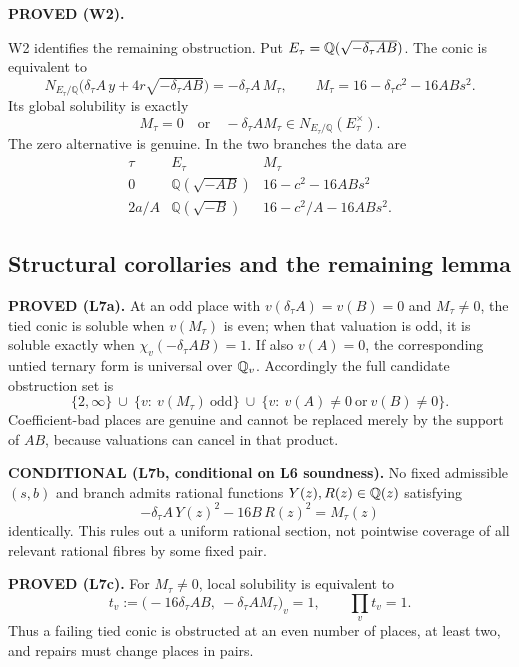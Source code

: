 \textbf{PROVED (W2).}

W2 identifies the remaining obstruction.  Put
$E_\tau=\mathbb{Q}(\sqrt{-\delta_\tau AB})$.  The conic is equivalent to
\[
N_{E_\tau/\mathbb Q}
\bigl(\delta_\tau A\,y+4r\sqrt{-\delta_\tau AB}\bigr)
=-\delta_\tau A\,M_\tau,
\qquad M_\tau=16-\delta_\tau c^2-16ABs^2.
\]
Its global solubility is exactly
\[
M_\tau=0\quad\text{or}\quad
-\delta_\tau A M_\tau\in N_{E_\tau/\mathbb Q}(E_\tau^\times).
\]
The zero alternative is genuine.  In the two branches the data are
\[
\begin{array}{c|c|c}
\tau& E_\tau&M_\tau\\ \hline
0&\mathbb Q(\sqrt{-AB})&16-c^2-16ABs^2\\
2a/A&\mathbb Q(\sqrt{-B})&16-c^2/A-16ABs^2.
\end{array}
\]

\subsection{Structural corollaries and the remaining lemma}

\textbf{PROVED (L7a).}
At an odd place with $v(\delta_\tau A)=v(B)=0$ and $M_\tau\neq0$, the tied
conic is soluble when $v(M_\tau)$ is even; when that valuation is odd, it
is soluble exactly when $\chi_v(-\delta_\tau AB)=1$.  If also $v(A)=0$,
the corresponding untied ternary form is universal over $\mathbb{Q}_v$.
Accordingly the full candidate obstruction set is
\[
\{2,\infty\}\ \cup\ \{v:\ v(M_\tau)\ \text{odd}\}\ \cup\ \{v:\ v(A)\ne0
\ \text{or}\ v(B)\ne0\}.
\]
Coefficient-bad places are genuine and cannot be replaced merely by the
support of $AB$, because valuations can cancel in that product.

\textbf{CONDITIONAL (L7b, conditional on L6 soundness).}
No fixed admissible $(s,b)$ and branch admits rational functions
$Y(z),R(z)\in\mathbb{Q}(z)$ satisfying
\[
-\delta_\tau A\,Y(z)^2-16B\,R(z)^2=M_\tau(z)
\]
identically.  This rules out a uniform rational section, not pointwise
coverage of all relevant rational fibres by some fixed pair.

\textbf{PROVED (L7c).}
For $M_\tau\neq0$, local solubility is equivalent to
\[
t_v:=\bigl(-16\delta_\tau AB,\ -\delta_\tau A M_\tau\bigr)_v=1,
\qquad \prod_v t_v=1.
\]
Thus a failing tied conic is obstructed at an even number of places, at
least two, and repairs must change places in pairs.

